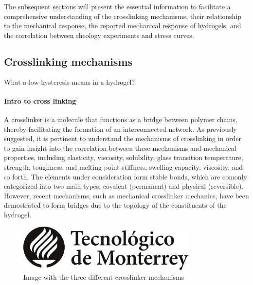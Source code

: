 The subsequent sections will present the essential information to facilitate a comprehensive understanding of the crosslinking mechanisms, their relationship to the mechanical response, the reported mechanical response of hydrogels, and the correlation between rheology experiments and stress curves.

\subsection{Crosslinking mechanisms}\label{ch1:Cross-linking}

What a low hysteresis means in a hydrogel?

\paragraph{Intro to cross linking}
A crosslinker is a molecule that functions as a bridge between polymer chains, thereby facilitating the formation of an interconnected network.
As previously suggested, it is pertinent to understand the mechanisms of crosslinking in order to gain insight into the correlation between these mechanisms and mechanical properties, including elasticity, viscosity, solubility, glass transition temperature, strength, toughness, and melting point stiffness, swelling capacity, viscosity, and so forth\citep{priyaComprehensiveReviewHydrogel2024}.
The elements under consideration form stable bonds, which are comonly categorized into two main types: covalent (permanent) and physical (reversible)\citep{bustamante-torresHydrogelsClassificationAccording2021}.
However, recent mechanisms, such as mechanical crosslinker mechanics, have been demostrated to form bridges due to the topology of the constituents of the hydrogel.

\begin{figure}[!h]
    \centering
    \includegraphics[width=0.8\textwidth]{pics/LogoTec.jpg}
    \caption{Image with the three different crosslinker mechanisms}
\end{figure}

